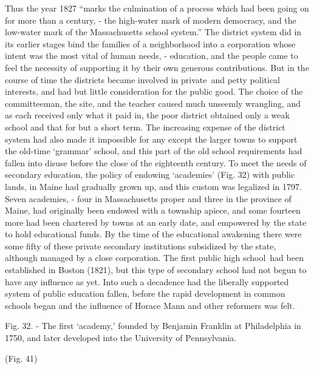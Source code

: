 \documentclass[]{book}
\begin{document}
Thus the year 1827 ``marks the culmination of a process which had been going on for more than a century, - the high-water mark of modern democracy, and the low-water mark of the Massachusetts school system.'' The district system did in its earlier stages bind the families of a neighborhood into a corporation whose intent was the most vital of human needs, - education, and the people came to feel the necessity of supporting it by their own generous contributions. But in the course of time the districts became involved in private~and petty political interests, and had but little consideration for the public good. The choice of the committeeman, the site, and the teacher caused much unseemly wrangling, and as each received only what it paid in, the poor district obtained only a weak school and that for but a short term. The increasing expense of the district system had also made it impossible for any except the larger towns to support the old-time `grammar' school, and this part of the old school requirements had fallen into disuse before the close of the eighteenth century. To meet the needs of secondary education, the policy of endowing `academies' (Fig. 32) with public lands, in Maine had gradually grown up, and this custom was legalized in 1797. Seven academies, - four in Massachusetts proper and three in the province of Maine, had originally been endowed with a township apiece, and some fourteen more had been chartered by towns at an early date, and empowered by the state to hold educational funds. By the time of the educational awakening there were some fifty of these private secondary institutions subsidized by the state, although managed by a close corporation. The first public high school~had been established in Boston (1821), but this type of secondary school had not begun to have any influence as yet. Into such a decadence had the liberally supported system of public education fallen, before the rapid development in common schools began and the influence of Horace Mann and other reformers was felt.

Fig. 32. - The first `academy,' founded by Benjamin Franklin at Philadelphia in 1750, and later developed into the University of Pennsylvania.

(Fig. 41)
\end{document}
